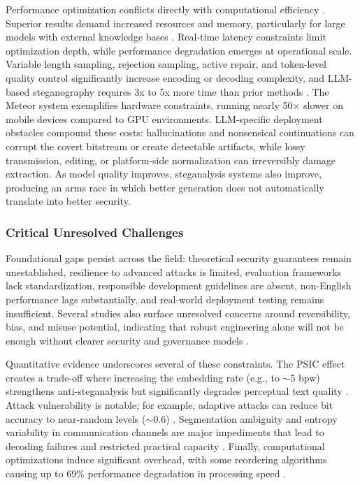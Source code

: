 Performance optimization conflicts directly with computational efficiency \cite{kaptchuk2021meteor}. Superior results demand increased resources and memory, particularly for large models with external knowledge bases \cite{ding2023discop}. Real-time latency constraints limit optimization depth, while performance degradation emerges at operational scale. Variable length sampling, rejection sampling, active repair, and token-level quality control significantly increase encoding or decoding complexity, and LLM-based steganography requires 3x to 5x more time than prior methods \cite{qi2024provably}. The Meteor system exemplifies hardware constraints, running nearly 50$\times$ slower on mobile devices compared to GPU environments. LLM-specific deployment obstacles compound these costs: hallucinations and nonsensical continuations can corrupt the covert bitstream or create detectable artifacts, while lossy transmission, editing, or platform-side normalization can irreversibly damage extraction. As model quality improves, steganalysis systems also improve, producing an arms race in which better generation does not automatically translate into better security.

\subsubsection{Critical Unresolved Challenges}

Foundational gaps persist across the field: theoretical security guarantees remain unestablished, resilience to advanced attacks is limited, evaluation frameworks lack standardization, responsible development guidelines are absent, non-English performance lags substantially, and real-world deployment testing remains insufficient. Several studies also surface unresolved concerns around reversibility, bias, and misuse potential, indicating that robust engineering alone will not be enough without clearer security and governance models \cite{zheng2022general,qiang2023natural,lin2024zero,bender2021dangers}.

Quantitative evidence underscores several of these constraints. The PSIC effect creates a trade-off where increasing the embedding rate (e.g., to ${\sim}5$ bpw) strengthens anti-steganalysis but significantly degrades perceptual text quality \cite{yang2020vae}. Attack vulnerability is notable; for example, adaptive attacks can reduce bit accuracy to near-random levels (${\sim}0.6$) \cite{ji2024principled}. Segmentation ambiguity and entropy variability in communication channels are major impediments that lead to decoding failures and restricted practical capacity \cite{kaptchuk2021meteor}. Finally, computational optimizations induce significant overhead, with some reordering algorithms causing up to 69\% performance degradation in processing speed \cite{ding2023discop}.

